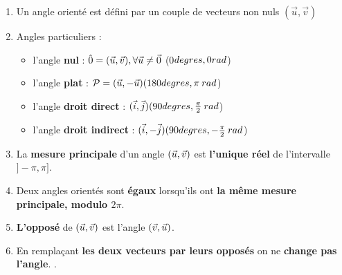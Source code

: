 \begin{enumerate}
\item Un angle orienté est défini par un couple de vecteurs non nuls $(\vec{u}, \vec{v})$

\item Angles particuliers :
\begin{itemize}
	\item l'angle \textbf{nul} : $\hat{0} = (\vec{u}, \vec{v}) , \forall \vec{u} \neq \vec{0} $  (0$\\degres, 0 rad$)
	\item l'angle \textbf{plat} :  $\mathcal{P} = (\vec{u}, -\vec{u}) (180\\degres, \pi \:rad $)
	\item l'angle \textbf{droit direct} : $(\vec{i}, \vec{j}) (90\\degres, \frac{\pi}{2} \: rad$)
	\item l'angle \textbf{droit indirect} : $(\vec{i}, -\vec{j}) (90\\degres, -\frac{\pi}{2} \: rad$)
\end{itemize}

\item La \textbf{mesure principale} d'un angle $(\vec{u}, \vec{v})$ est \textbf{l'unique réel} de l'intervalle $]-\pi, \pi]$.

\item Deux angles orientés sont \textbf{égaux} lorsqu'ils ont \textbf{la même mesure principale, modulo $2\pi$}.

\item \textbf{L'opposé} de $(\vec{u}, \vec{v})$ est l'angle $(\vec{v}, \vec{u})$. %

\item En remplaçant \textbf{les deux vecteurs par leurs opposés} on ne \textbf{change pas l'angle}. %
.
\end{enumerate}

